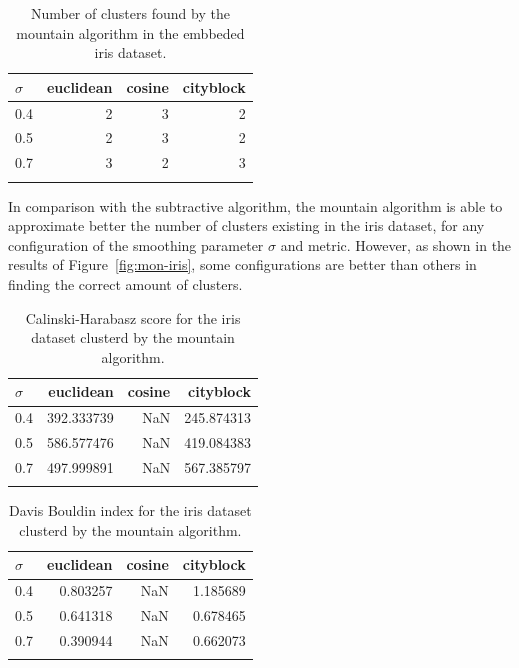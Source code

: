 \documentclass[conference]{IEEEtran}
\begin{document}
\begin{itemize}
    \begin{table}[ht!]
        \centering
        \begin{tabular}{lrrr}
        \toprule
        $\sigma$ &  euclidean &  cosine &  cityblock \\
        \midrule
        0.4 &          2 &       3 &          2 \\
        0.5 &          2 &       3 &          2 \\
        0.7 &          3 &       2 &          3 \\
        \bottomrule \\
        \end{tabular}
        \caption{Number of clusters found by the mountain algorithm in the embbeded iris dataset.}
        \label{tab:ie_n_m}
    \end{table}
    In comparison with the subtractive algorithm, the mountain algorithm is able to approximate better the number of clusters existing in the iris dataset, for any configuration of the smoothing parameter $\sigma$ and metric. However, as shown in the results of Figure~\ref{fig:mon-iris}, some configurations are better than others in finding the correct amount of clusters.
    \begin{table}[ht!]
        \centering
        \begin{tabular}{lrrr}
        \toprule
        $\sigma$ &   euclidean &  cosine &   cityblock \\
        \midrule
        0.4 &  392.333739 &     NaN &  245.874313 \\
        0.5 &  586.577476 &     NaN &  419.084383 \\
        0.7 &  497.999891 &     NaN &  567.385797 \\
        \bottomrule \\
        \end{tabular}
        \caption{Calinski-Harabasz score for the iris dataset clusterd by the mountain algorithm.}
        \label{tab:i1_ch_m}
    \end{table}
    
    \begin{table}[ht!]
        \centering
        \begin{tabular}{lrrr}
        \toprule
        $\sigma$ &  euclidean &  cosine &  cityblock \\
        \midrule
        0.4 &   0.803257 &     NaN &   1.185689 \\
        0.5 &   0.641318 &     NaN &   0.678465 \\
        0.7 &   0.390944 &     NaN &   0.662073 \\
        \bottomrule \\
        \end{tabular}
        \caption{Davis Bouldin index for the iris dataset clusterd by the mountain algorithm.}
        \label{tab:i1_db_m}
    \end{table}
    

\end{itemize}
\end{document}
